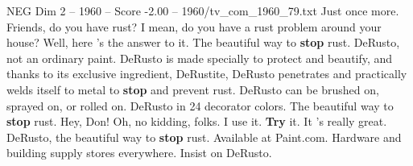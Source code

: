 \begin{textsample}{NEG Dim 2 – 1960 – Score -2.00 – 1960/tv\_com\_1960\_79.txt}  \label{ex:f2_neg_075}
Just once more.
Friends, do you have rust?
I mean, do you have a rust problem around your house?
Well, here 's the answer to it.
The beautiful way to \textbf{stop} rust.
DeRusto, not an ordinary paint.
DeRusto is made specially to protect and beautify, and thanks to its exclusive ingredient, DeRustite, DeRusto penetrates and practically welds itself to metal to \textbf{stop} and prevent rust.
DeRusto can be brushed on, sprayed on, or rolled on.
DeRusto in 24 decorator colors.
The beautiful way to \textbf{stop} rust.
Hey, Don!
Oh, no kidding, folks.
I use it. \textbf{Try} it.
It 's really great.
DeRusto, the beautiful way to \textbf{stop} rust.
Available at Paint.com.
Hardware and building supply stores everywhere.
Insist on DeRusto.

\end{textsample}

